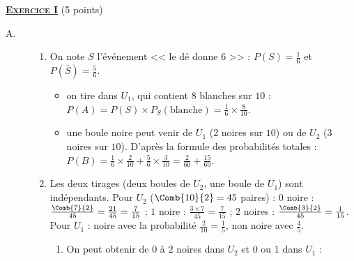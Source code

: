 \providecommand{\Courbe}{(\mathscr{C})}
\providecommand{\cm}{~\mathrm{cm}}
\providecommand{\dx}{~\mathrm{d}x}
%
\noindent \underline{\textsc{\textbf{Exercice I}}} (5 points)
	\begin{description}
		\item[A.]
			\begin{enumerate}
				\item On note $S$ l'événement << le dé donne 6 >> : $P(S) = \frac{1}{6}$ et $P(\bar{S}) = \frac{5}{6}$.
					\begin{itemize}
						\item {} on tire dans $U_1$, qui contient $8$ blanches sur $10$ :
							$P(A) = P(S)\times P_S(\text{blanche}) = \frac{1}{6}\times\frac{8}{10}$.

						\item {} une boule noire peut venir de $U_1$ ($2$ noires sur $10$) ou de $U_2$ ($3$ noires sur $10$).
							D'après la formule des probabilités totales :
							$P(B) = \frac{1}{6}\times\frac{2}{10} + \frac{5}{6}\times\frac{3}{10} = \frac{2}{60} + \frac{15}{60}$.

					\end{itemize}
				\item Les deux tirages (deux boules de $U_2$, une boule de $U_1$) sont indépendants.
					Pour $U_2$ ($\Comb{10}{2} = 45$ paires) : $0$ noire : $\frac{\Comb{7}{2}}{45} = \frac{21}{45} = \frac{7}{15}$ ;
					$1$ noire : $\frac{3\times7}{45} = \frac{7}{15}$ ; $2$ noires : $\frac{\Comb{3}{2}}{45} = \frac{1}{15}$.
					Pour $U_1$ : noire avec la probabilité $\frac{2}{10} = \frac{1}{5}$, non noire avec $\frac{4}{5}$.
					\begin{enumerate}
						\item On peut obtenir de $0$ à $2$ noires dans $U_2$ et $0$ ou $1$ dans $U_1$ :


\end{enumerate}
\end{enumerate}
\end{description}
